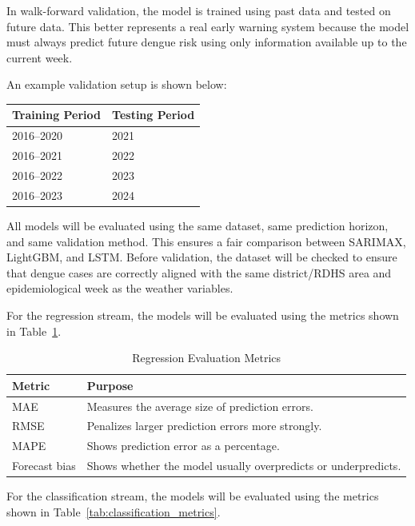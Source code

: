 \documentclass[12pt,a4paper]{article}
\begin{document}
In walk-forward validation, the model is trained using past data and tested on future data. This better represents a real early warning system because the model must always predict future dengue risk using only information available up to the current week.

An example validation setup is shown below:

\begin{center}
\begin{tabular}{p{5cm} p{5cm}}
\toprule
\textbf{Training Period} & \textbf{Testing Period} \\
\midrule
2016--2020 & 2021 \\
2016--2021 & 2022 \\
2016--2022 & 2023 \\
2016--2023 & 2024 \\
\bottomrule
\end{tabular}
\end{center}

All models will be evaluated using the same dataset, same prediction horizon, and same validation method. This ensures a fair comparison between SARIMAX, LightGBM, and LSTM. Before validation, the dataset will be checked to ensure that dengue cases are correctly aligned with the same district/RDHS area and epidemiological week as the weather variables.

For the regression stream, the models will be evaluated using the metrics shown in Table~\ref{tab:regression_metrics}.

\begin{table}[htbp]
\centering
\caption{Regression Evaluation Metrics}
\label{tab:regression_metrics}
\begin{tabular}{p{3.5cm} p{9cm}}
\toprule
\textbf{Metric} & \textbf{Purpose} \\
\midrule
MAE & Measures the average size of prediction errors. \\

RMSE & Penalizes larger prediction errors more strongly. \\

MAPE & Shows prediction error as a percentage. \\

Forecast bias & Shows whether the model usually overpredicts or underpredicts. \\
\bottomrule
\end{tabular}
\end{table}

For the classification stream, the models will be evaluated using the metrics shown in Table~\ref{tab:classification_metrics}.
\end{document}
